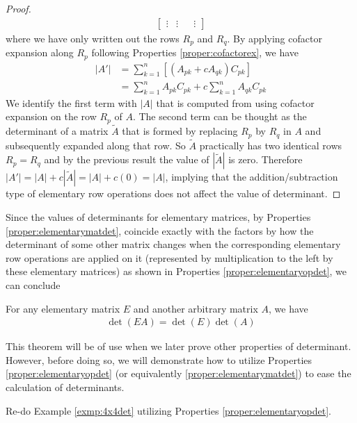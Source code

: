 \begin{proof}
\begin{align*}
\begin{bmatrix}
\vdots & \vdots & & \vdots
\end{bmatrix}
\end{align*}
where we have only written out the rows $R_p$ and $R_q$. By applying cofactor expansion along $R_p$ following Properties \ref{proper:cofactorex}, we have
\begin{align*}
|A'| &= \sum_{k=1}^{n} [(A_{pk} + cA_{qk}) C_{pk}] \\
&= \sum_{k=1}^{n} A_{pk}C_{pk} + c\sum_{k=1}^{n} A_{qk}C_{pk}
\end{align*}
We identify the first term with $|A|$ that is computed from using cofactor expansion on the row $R_p$ of $A$. The second term can be thought as the determinant of a matrix $\tilde{A}$ that is formed by replacing $R_p$ by $R_q$ in $A$ and subsequently expanded along that row. So $\tilde{A}$ practically has two identical rows $R_p = R_q$ and by the previous result the value of $|\tilde{A}|$ is zero. Therefore $|A'| = |A| + c|\tilde{A}| = |A| + c(0) = |A|$, implying that the addition/subtraction type of elementary row operations does not affect the value of determinant.
\end{proof}
Since the values of determinants for elementary matrices, by Properties \ref{proper:elementarymatdet}, coincide exactly with the factors by how the determinant of some other matrix changes when the corresponding elementary row operations are applied on it (represented by multiplication to the left by these elementary matrices) as shown in Properties \ref{proper:elementaryopdet}, we can conclude
\begin{thm}
\label{thm:elementarytimesdet}
For any elementary matrix $E$ and another arbitrary matrix $A$, we have
\begin{align*}
\det(EA) = \det(E)\det(A)
\end{align*}
\end{thm}
This theorem will be of use when we later prove other properties of determinant. However, before doing so, we will demonstrate how to utilize Properties \ref{proper:elementaryopdet} (or equivalently \ref{proper:elementarymatdet}) to ease the calculation of determinants.
\begin{exmp}
Re-do Example \ref{exmp:4x4det} utilizing Properties \ref{proper:elementaryopdet}.
\end{exmp}
